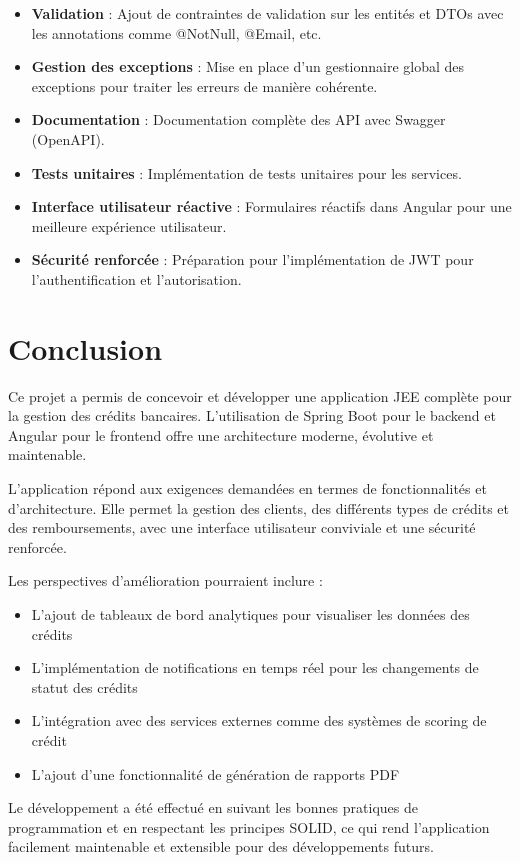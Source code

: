 \begin{itemize}
    \item \textbf{Validation} : Ajout de contraintes de validation sur les entités et DTOs avec les annotations comme @NotNull, @Email, etc.
    \item \textbf{Gestion des exceptions} : Mise en place d'un gestionnaire global des exceptions pour traiter les erreurs de manière cohérente.
    \item \textbf{Documentation} : Documentation complète des API avec Swagger (OpenAPI).
    \item \textbf{Tests unitaires} : Implémentation de tests unitaires pour les services.
    \item \textbf{Interface utilisateur réactive} : Formulaires réactifs dans Angular pour une meilleure expérience utilisateur.
    \item \textbf{Sécurité renforcée} : Préparation pour l'implémentation de JWT pour l'authentification et l'autorisation.
\end{itemize}

\section{Conclusion}
Ce projet a permis de concevoir et développer une application JEE complète pour la gestion des crédits bancaires. L'utilisation de Spring Boot pour le backend et Angular pour le frontend offre une architecture moderne, évolutive et maintenable.

L'application répond aux exigences demandées en termes de fonctionnalités et d'architecture. Elle permet la gestion des clients, des différents types de crédits et des remboursements, avec une interface utilisateur conviviale et une sécurité renforcée.

Les perspectives d'amélioration pourraient inclure :
\begin{itemize}
    \item L'ajout de tableaux de bord analytiques pour visualiser les données des crédits
    \item L'implémentation de notifications en temps réel pour les changements de statut des crédits
    \item L'intégration avec des services externes comme des systèmes de scoring de crédit
    \item L'ajout d'une fonctionnalité de génération de rapports PDF
\end{itemize}

Le développement a été effectué en suivant les bonnes pratiques de programmation et en respectant les principes SOLID, ce qui rend l'application facilement maintenable et extensible pour des développements futurs.
